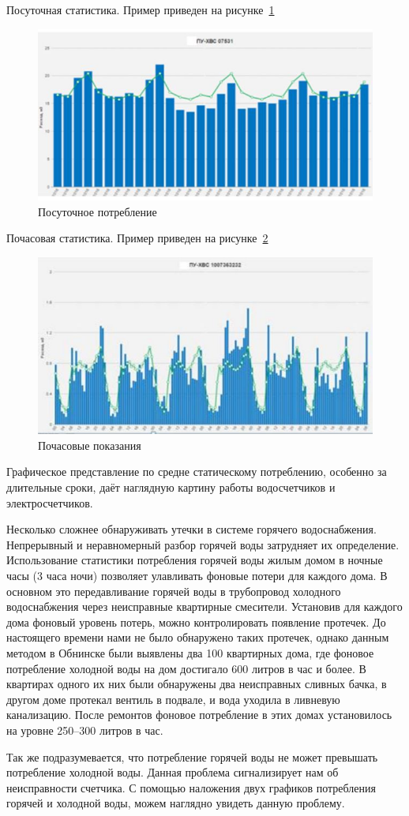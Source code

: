 Посуточная статистика. Пример приведен на рисунке~\ref{fig:day}
\begin{figure}[H]
	\centering
	\includegraphics[width=0.8\linewidth]{pics/day}
	\caption{Посуточное потребление}
	\label{fig:day} 
\end{figure}
Почасовая статистика. Пример приведен на рисунке~\ref{fig:hour}
\begin{figure}[H]
	\centering
	\includegraphics[width=0.9\linewidth]{pics/hour}
	\caption{Почасовые показания}
	\label{fig:hour} 
\end{figure}

Графическое представление по средне статическому потреблению, особенно за длительные сроки, даёт наглядную картину работы водосчетчиков и электросчетчиков. 

Несколько сложнее обнаруживать утечки в системе горячего водоснабжения. Непрерывный и неравномерный разбор горячей воды затрудняет их определение. Использование статистики потребления горячей воды жилым домом в ночные часы (3 часа ночи) позволяет улавливать фоновые потери для каждого дома. В основном это передавливание горячей воды в трубопровод холодного водоснабжения через неисправные квартирные смесители. Установив для каждого дома фоновый уровень потерь, можно контролировать появление протечек. До настоящего времени нами не было обнаружено таких протечек, однако данным методом в Обнинске были выявлены два 100 квартирных дома, где фоновое потребление холодной воды на дом достигало 600 литров в час и более. В квартирах одного их них были обнаружены два неисправных сливных бачка, в другом доме протекал вентиль в подвале, и вода уходила в ливневую канализацию. После ремонтов фоновое потребление в этих домах установилось на уровне 250–300 литров в час. \cite{journal2}

Так же подразумевается, что потребление горячей воды не может превышать потребление холодной воды. Данная проблема сигнализирует нам об неисправности счетчика. С помощью наложения двух графиков потребления горячей и холодной воды, можем наглядно увидеть данную проблему. 